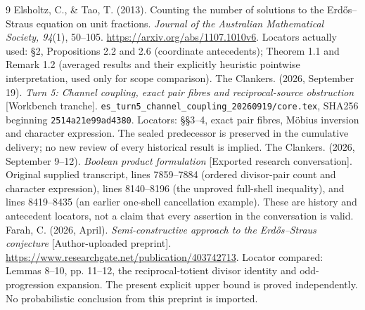 \begin{thebibliography}{9}
Elsholtz, C., \& Tao, T. (2013).
Counting the number of solutions to the Erd\H{o}s--Straus equation on unit fractions.
\emph{Journal of the Australian Mathematical Society, 94}(1), 50--105.
\url{https://arxiv.org/abs/1107.1010v6}.
Locators actually used: \S2, Propositions 2.2 and 2.6 (coordinate antecedents);
Theorem 1.1 and Remark 1.2 (averaged results and their explicitly heuristic
pointwise interpretation, used only for scope comparison).
The Clankers. (2026, September 19).
\emph{Turn 5: Channel coupling, exact pair fibres and reciprocal-source obstruction}
[Workbench tranche].
\texttt{es\_turn5\_channel\_coupling\_20260919/core.tex},
SHA256 beginning \texttt{2514a21e99ad4380}.
Locators: \S\S3--4, exact pair fibres, M\"obius inversion and character expression.
The sealed predecessor is preserved in the cumulative delivery; no new review
of every historical result is implied.
The Clankers. (2026, September 9--12).
\emph{Boolean product formulation} [Exported research conversation].
Original supplied transcript, lines 7859--7884 (ordered divisor-pair count and
character expression), lines 8140--8196 (the unproved full-shell inequality),
and lines 8419--8435 (an earlier one-shell cancellation example).
These are history and antecedent locators, not a claim that every assertion in
the conversation is valid.
Farah, C. (2026, April).
\emph{Semi-constructive approach to the Erd\H{o}s--Straus conjecture}
[Author-uploaded preprint].
\url{https://www.researchgate.net/publication/403742713}.
Locator compared: Lemmas 8--10, pp. 11--12, the reciprocal-totient divisor identity
and odd-progression expansion. The present explicit upper bound is proved
independently. No probabilistic conclusion from this preprint is imported.
\end{thebibliography}
